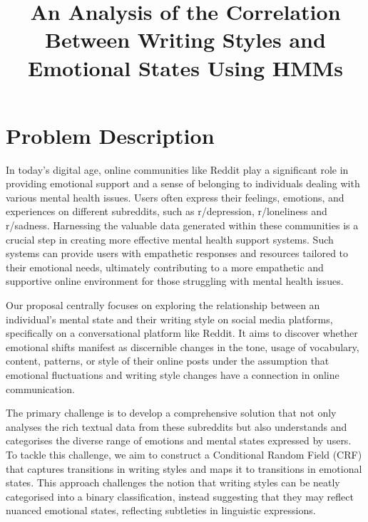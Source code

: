 \documentclass[conference,compsoc]{IEEEtran}
\begin{document}
\title{An Analysis of the Correlation Between Writing Styles and Emotional States Using HMMs}

\author{
\and
{}
}


\maketitle





\section{Problem Description}
In today's digital age, online communities like Reddit play a significant role in providing emotional support and a sense of belonging to individuals dealing with various mental health issues. Users often express their feelings, emotions, and experiences on different subreddits, such as r/depression, r/loneliness and r/sadness. Harnessing the valuable data generated within these communities is a crucial step in creating more effective mental health support systems. Such systems can provide users with empathetic responses and resources tailored to their emotional needs, ultimately contributing to a more empathetic and supportive online environment for those struggling with mental health issues.

Our proposal centrally focuses on exploring the relationship between an individual's mental state and their writing style on social media platforms, specifically on a conversational platform like Reddit. It aims to discover whether emotional shifts manifest as discernible changes in the tone, usage of vocabulary, content, patterns, or style of their online posts under the assumption that emotional fluctuations and writing style changes have a connection in online communication. 

The primary challenge is to develop a comprehensive solution that not only analyses the rich textual data from these subreddits but also understands and categorises the diverse range of emotions and mental states expressed by users. To tackle this challenge, we aim to construct a Conditional Random Field (CRF) that captures transitions in writing styles and maps it to transitions in emotional states. This approach challenges the notion that writing styles can be neatly categorised into a binary classification, instead suggesting that they may reflect nuanced emotional states, reflecting subtleties in linguistic expressions. 
\end{document}
